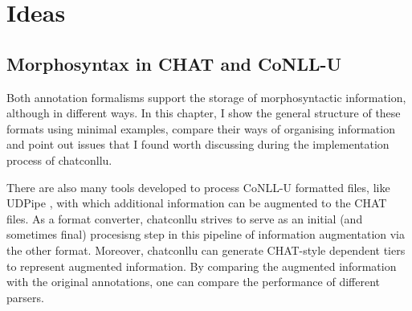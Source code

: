 \chapter{Ideas} %

\label{Chapter8} %

\section{Morphosyntax in CHAT and CoNLL-U}

Both annotation formalisms support the storage of morphosyntactic information, although in different ways. In this chapter, I show the general structure of these formats using minimal examples, compare their ways of organising information and point out issues that I found worth discussing during the implementation process of chatconllu.

There are also many tools developed to process CoNLL-U formatted files, like UDPipe \cite{straka-etal-2016-udpipe}, with which additional information can be augmented to the CHAT files. As a format converter, chatconllu strives to serve as an initial (and sometimes final) procesisng step in this pipeline of information augmentation via the other format. Moreover, chatconllu can generate CHAT-style dependent tiers to represent augmented information. By comparing the augmented information with the original annotations, one can compare the performance of different parsers.



